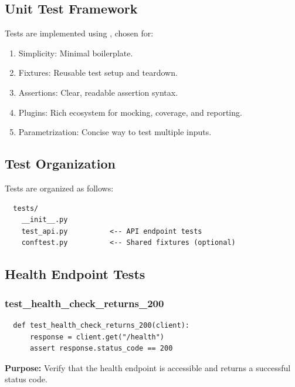 \subsection{Unit Test Framework}

Tests are implemented using , chosen for:

\begin{enumerate}
  \item Simplicity: Minimal boilerplate.
  
  \item Fixtures: Reusable test setup and teardown.
  
  \item Assertions: Clear, readable assertion syntax.
  
  \item Plugins: Rich ecosystem for mocking, coverage, and reporting.
  
  \item Parametrization: Concise way to test multiple inputs.
\end{enumerate}

\subsection{Test Organization}

Tests are organized as follows:

\begin{verbatim}
  tests/
    __init__.py
    test_api.py          <-- API endpoint tests
    conftest.py          <-- Shared fixtures (optional)
\end{verbatim}

\subsection{Health Endpoint Tests}

\subsubsection{test\_health\_check\_returns\_200}

\begin{verbatim}
  def test_health_check_returns_200(client):
      response = client.get("/health")
      assert response.status_code == 200
\end{verbatim}

\textbf{Purpose:} Verify that the health endpoint is accessible and returns a successful status code.

